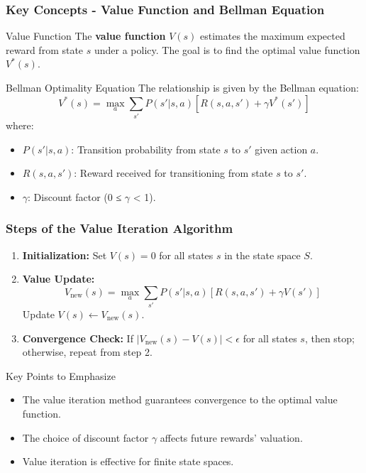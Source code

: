\documentclass[aspectratio=169]{beamer}
\begin{document}
\begin{frame}[fragile]
    \frametitle{Key Concepts - Value Function and Bellman Equation}
    \begin{block}{Value Function}
        The \textbf{value function} \( V(s) \) estimates the maximum expected reward from state \( s \) under a policy. The goal is to find the optimal value function \( V^*(s) \).
    \end{block}
    
    \begin{block}{Bellman Optimality Equation}
        The relationship is given by the Bellman equation:
        \begin{equation}
            V^*(s) = \max_a \sum_{s'} P(s' | s, a) [R(s, a, s') + \gamma V^*(s')]
        \end{equation}
        where:
        \begin{itemize}
            \item \( P(s' | s, a) \): Transition probability from state \( s \) to \( s' \) given action \( a \).
            \item \( R(s, a, s') \): Reward received for transitioning from state \( s \) to \( s' \).
            \item \( \gamma \): Discount factor (0 ≤ \( \gamma \) < 1).
        \end{itemize}
    \end{block}
\end{frame}

\begin{frame}[fragile]
    \frametitle{Steps of the Value Iteration Algorithm}
    \begin{enumerate}
        \item \textbf{Initialization:} Set \( V(s) = 0 \) for all states \( s \) in the state space \( S \).
        
        \item \textbf{Value Update:}
        \begin{equation}
            V_{\text{new}}(s) = \max_a \sum_{s'} P(s' | s, a) [R(s, a, s') + \gamma V(s')]
        \end{equation}
        Update \( V(s) \leftarrow V_{\text{new}}(s) \).
        
        \item \textbf{Convergence Check:}
        If \( |V_{\text{new}}(s) - V(s)| < \epsilon \) for all states \( s \), then stop; otherwise, repeat from step 2.
    \end{enumerate}
    
    \begin{block}{Key Points to Emphasize}
        \begin{itemize}
            \item The value iteration method guarantees convergence to the optimal value function.
            \item The choice of discount factor \( \gamma \) affects future rewards' valuation.
            \item Value iteration is effective for finite state spaces.
        \end{itemize}
    \end{block}
\end{frame}
\end{document}
